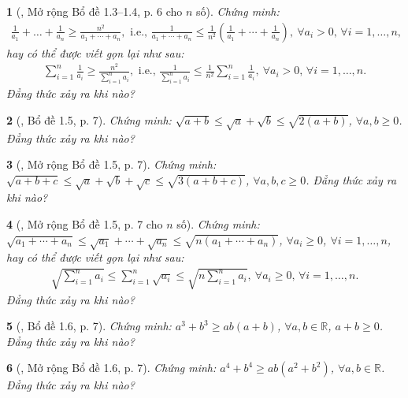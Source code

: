 \documentclass{article}
\newtheorem{baitoan}{}
\begin{document}
\begin{baitoan}[\cite{Son_Nghiep_Trung_Can2021}, Mở rộng Bổ đề 1.3--1.4, p. 6 cho $n$ số]
	Chứng minh:
	\begin{align*}
		\frac{1}{a_1} + \ldots + \frac{1}{a_n}\ge\frac{n^2}{a_1 + \cdots + a_n},\mbox{ i.e., }\frac{1}{a_1 + \cdots + a_n}\le\frac{1}{n^2}\left(\frac{1}{a_1} + \cdots + \frac{1}{a_n}\right),\ \forall a_i > 0,\,\forall i = 1,\ldots,n,
	\end{align*}
	hay có thể được viết gọn lại như sau:
	\begin{align*}
		\sum_{i=1}^{n} \frac{1}{a_i}\ge\frac{n^2}{\sum_{i=1}^n a_i},\mbox{ i.e., }\frac{1}{\sum_{i=1}^n a_i}\le\frac{1}{n^2}\sum_{i=1}^n \frac{1}{a_i},\ \forall a_i > 0,\,\forall i = 1,\ldots,n.
	\end{align*}
	Đẳng thức xảy ra khi nào?
\end{baitoan}

\begin{baitoan}[\cite{Son_Nghiep_Trung_Can2021}, Bổ đề 1.5, p. 7]
	Chứng minh: $\sqrt{a + b}\le\sqrt{a} + \sqrt{b}\le\sqrt{2(a + b)}$, $\forall a,b\ge 0$. Đẳng thức xảy ra khi nào?
\end{baitoan}

\begin{baitoan}[\cite{Son_Nghiep_Trung_Can2021}, Mở rộng Bổ đề 1.5, p. 7]
	Chứng minh: $\sqrt{a + b + c}\le\sqrt{a} + \sqrt{b} + \sqrt{c}\le\sqrt{3(a + b + c)}$, $\forall a,b,c\ge 0$. Đẳng thức xảy ra khi nào?
\end{baitoan}

\begin{baitoan}[\cite{Son_Nghiep_Trung_Can2021}, Mở rộng Bổ đề 1.5, p. 7 cho $n$ số]
	Chứng minh: $\sqrt{a_1 + \cdots + a_n}\le\sqrt{a_1} + \cdots + \sqrt{a_n}\le\sqrt{n(a_1 + \cdots + a_n)}$, $\forall a_i\ge 0$, $\forall i = 1,\ldots,n$, hay có thể được viết gọn lại như sau:
	\begin{align*}
		\sqrt{\sum_{i=1}^n a_i}\le\sum_{i=1}^n \sqrt{a_i}\le\sqrt{n\sum_{i=1}^n a_i},\ \forall a_i\ge 0,\,\forall i = 1,\ldots,n.
	\end{align*}
	Đẳng thức xảy ra khi nào?
\end{baitoan}

\begin{baitoan}[\cite{Son_Nghiep_Trung_Can2021}, Bổ đề 1.6, p. 7]
	Chứng minh: $a^3 + b^3\ge ab(a + b)$, $\forall a,b\in\mathbb{R}$, $a + b\ge 0$. Đẳng thức xảy ra khi nào?
\end{baitoan}

\begin{baitoan}[\cite{Son_Nghiep_Trung_Can2021}, Mở rộng Bổ đề 1.6, p. 7]
	Chứng minh: $a^4 + b^4\ge ab(a^2 + b^2)$, $\forall a,b\in\mathbb{R}$. Đẳng thức xảy ra khi nào?
\end{baitoan}
\end{document}
